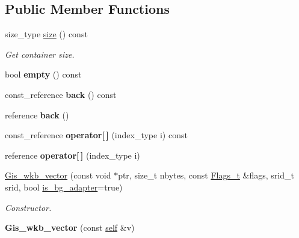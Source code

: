 \subsection*{Public Member Functions}
\begin{DoxyCompactItemize}
\item 
size\+\_\+type \mbox{\hyperlink{classGis__wkb__vector_ab2674617e53e783614911ad5cfe890b7}{size}} () const
\begin{DoxyCompactList}\small\item\em Get container size. \end{DoxyCompactList}\item 
\mbox{\label{classGis__wkb__vector_ac9abeea1b7a84bf5e8e60dbbeb60395d}} 
bool {\bfseries empty} () const
\item 
\mbox{\label{classGis__wkb__vector_a2476eaba0e78a890a5af5b9c3c5e9294}} 
const\+\_\+reference {\bfseries back} () const
\item 
\mbox{\label{classGis__wkb__vector_a86256755bde9d698f54068024ac6927e}} 
reference {\bfseries back} ()
\item 
\mbox{\label{classGis__wkb__vector_a5465166f513105d4ea1673895f695272}} 
const\+\_\+reference {\bfseries operator\mbox{[}$\,$\mbox{]}} (index\+\_\+type i) const
\item 
\mbox{\label{classGis__wkb__vector_ad64ea2b3a124273033f8e76d98819a3b}} 
reference {\bfseries operator\mbox{[}$\,$\mbox{]}} (index\+\_\+type i)
\item 
\mbox{\hyperlink{classGis__wkb__vector_a2438c0e293166b7b4a30e19925a423b1}{Gis\+\_\+wkb\+\_\+vector}} (const void $\ast$ptr, size\+\_\+t nbytes, const \mbox{\hyperlink{classGeometry_1_1Flags__t}{Flags\+\_\+t}} \&flags, srid\+\_\+t srid, bool \mbox{\hyperlink{classGeometry_ada614004627a9e7af129e51a34242af9}{is\+\_\+bg\+\_\+adapter}}=true)
\begin{DoxyCompactList}\small\item\em Constructor. \end{DoxyCompactList}\item 
\mbox{\label{classGis__wkb__vector_a29dda00bc60238e919db14e2b69ffe16}} 
{\bfseries Gis\+\_\+wkb\+\_\+vector} (const \mbox{\hyperlink{classGis__wkb__vector}{self}} \&v)

\end{DoxyCompactItemize}
